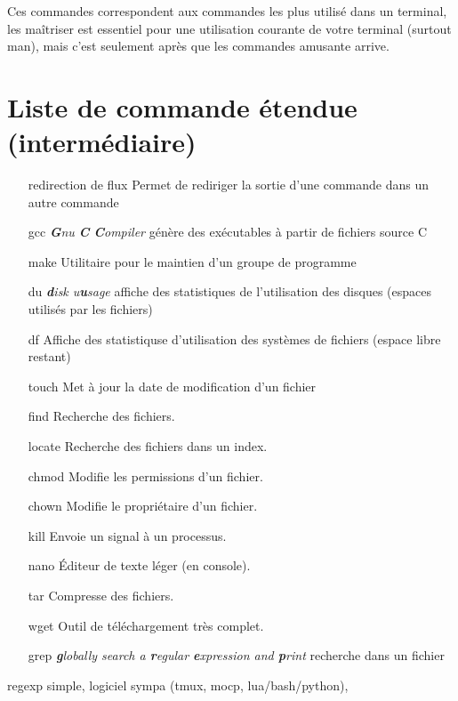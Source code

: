 \documentclass[french, a4paper, 12pt, titlepage]{article}
\begin{document}
Ces commandes correspondent aux commandes les plus utilisé dans un terminal,
les maîtriser est essentiel pour une utilisation courante de votre terminal (surtout man), mais c'est seulement après que les commandes amusante arrive.

\newpage

\section{Liste de commande étendue (intermédiaire)}
\begin{enumerate}
\item[redirection de flux] Permet de rediriger la sortie d'une commande dans un autre commande
\item[gcc] \emph{\textbf{G}nu \textbf{C} \textbf{C}ompiler}  génère des exécutables à partir de fichiers source C
\item[make] Utilitaire pour le maintien d'un groupe de programme
\item[du] \emph{\textbf{d}isk u\textbf{u}sage} affiche des statistiques de l'utilisation des disques (espaces utilisés par les fichiers)
\item[df] Affiche des statistiquse d'utilisation des systèmes de fichiers (espace libre restant)
\item[touch] Met à jour la date de modification d'un fichier
\item[find] Recherche des fichiers.
\item[locate] Recherche des fichiers dans un index.
\item[chmod] Modifie les permissions d'un fichier.
\item[chown] Modifie le propriétaire d'un fichier.
\item[kill] Envoie un signal à un processus.
\item[nano] Éditeur de texte léger (en console).
\item[tar] Compresse des fichiers.
\item[wget] Outil de téléchargement très complet.
\item[grep] \emph{\textbf{g}lobally search a \textbf{r}egular \textbf{e}xpression and \textbf{p}rint} recherche dans un fichier
\end{enumerate}
regexp simple, logiciel sympa (tmux, mocp, lua/bash/python),















\newpage
\end{document}
